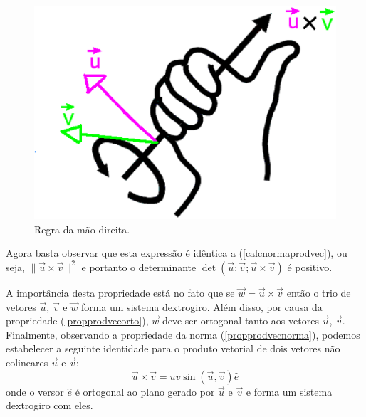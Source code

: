\begin{figure}%
     \includegraphics[width=\textwidth]{./cap_algvet/figs/R_mao_dir.eps}
      \caption{Regra da mão direita. }
  \end{figure}


Agora basta observar que esta expressão é idêntica a (\ref{calcnormaprodvec}), ou seja, $\|\vec{u}\times\vec{v}\|^2$ e portanto o determinante $\det\left(\vec{u};\vec{v};\vec{u}\times\vec{v}\right)$ é positivo.

A importância desta propriedade está no fato que se $\vec{w}=\vec{u}\times \vec{v}$ então o trio de vetores $\vec{u}$, $\vec{v}$ e $\vec{w}$ forma um sistema dextrogiro. Além disso, por causa da propriedade (\ref{propprodvecorto}), $\vec{w}$ deve ser ortogonal tanto aos vetores $\vec{u}$, $\vec{v}$. Finalmente, observando a propriedade da norma (\ref{propprodvecnorma}), podemos estabelecer a seguinte identidade para o produto vetorial de dois vetores não colineares $\vec{u}$ e $\vec{v}$:
\begin{equation}
\vec{u}\times\vec{v}=uv\sin\left(\vec{u},\vec{v}\right)\hat{e}
\end{equation}
onde o versor $\hat{e}$ é ortogonal ao plano gerado por $\vec{u}$ e $\vec{v}$ e forma um sistema dextrogiro com eles.

